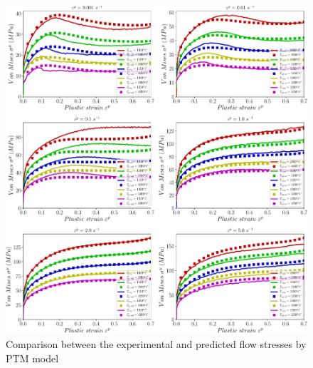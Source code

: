 \documentclass[twoside,english,1p,final,sort&compress]{elsarticle}
\theoremstyle{plain}
\begin{document}
\begin{figure}[!ht]
\centering
\includegraphics[width=1.02\columnwidth]
{newFigures/CompExpPTM}
\caption{Comparison between the experimental and predicted flow stresses by PTM model }
\label{fig:iCorrelationPTM}
\end{figure}
\FloatBarrier

\end{document}
